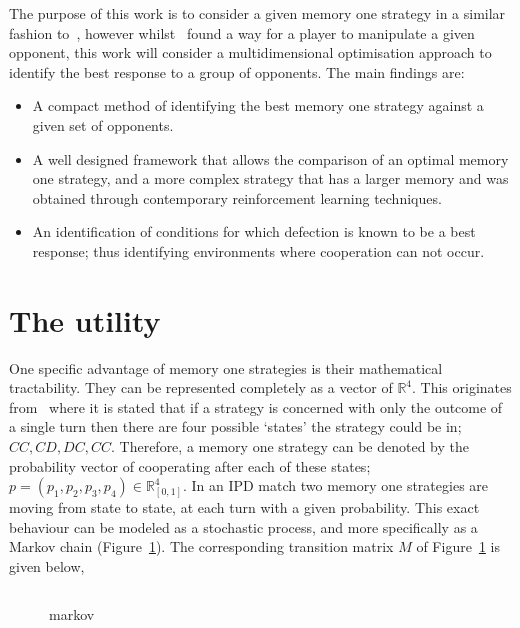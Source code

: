\documentclass[10pt]{article}
\newcommand{\R}{\mathbb{R}}
\begin{document}
The purpose of this work is to consider a given memory one strategy in a similar
fashion to~\cite{Press2012}, however whilst~\cite{Press2012} found a way for a
player to manipulate a given opponent, this work will consider a
multidimensional optimisation approach to identify the best response to a group
of opponents. The main findings are:

\begin{itemize}
    \item A compact method of identifying the best memory one strategy against a
    given set of opponents.
    \item A well designed framework that allows the comparison of an optimal memory
          one strategy, and a more complex strategy that has a larger memory and
          was obtained through contemporary reinforcement learning techniques.
    \item An identification of conditions for which defection is known to be
          a best response; thus identifying environments where cooperation can
          not occur.
\end{itemize}

\section{The utility}\label{section:utility}

One specific advantage of memory one strategies is their mathematical
tractability. They can be represented completely as a vector of \(\R^{4}\). This
originates from~\cite{Nowak1989} where it is stated that if a strategy is
concerned with only the outcome of a single turn then there are four possible
`states' the strategy could be in; \(CC, CD, DC,CC\). Therefore, a memory one
strategy can be denoted by the probability vector of cooperating after each of
these states; \(p=(p_1, p_2, p_3, p_4) \in \R_{[0,1]} ^ 4\). In an IPD match two
memory one strategies are moving from state to state, at each turn with a given
probability. This exact behaviour can be modeled as a stochastic process, and
more specifically as a Markov chain (Figure~\ref{fig:markov_chain}). The
corresponding transition matrix \(M\) of Figure~\ref{fig:markov_chain} is given
below,

\begin{figure}
    \begin{minipage}{0.35\textwidth}
        
        \caption{markov}
        \label{fig:markov_chain}
    \end{minipage}
    \begin{minipage}{0.45\textwidth}
    \begin{equation*}
        
    \end{equation*}
    \end{minipage}
\end{figure}
\end{document}
